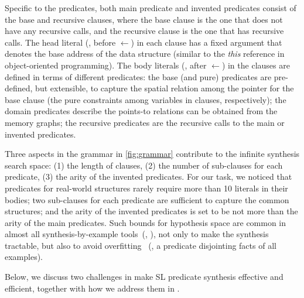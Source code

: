 Specific to the predicates,
both main predicate and invented predicates consist of the base and recursive clauses, where the base clause is the one that does not have any recursive calls, and the recursive clause is the one that has recursive calls. The head literal (\ie, before $\leftarrow$) in each clause has a fixed argument  that denotes the base address of the data structure (similar to the \textit{this} reference in object-oriented programming).
% 
The body literals (\ie, after $\leftarrow$) in the clauses are defined in terms of different predicates: the base (and pure) predicates are pre-defined, but extensible, to capture the spatial relation among the pointer for the base clause (the pure constraints among variables in clauses, respectively); the domain predicates describe the points-to relations can be obtained from the memory graphs; the recursive predicates are the recursive calls to the main or invented predicates.



Three aspects in the grammar in \autoref{fig:grammar} contribute to the
infinite synthesis search space: (1) the length of clauses, (2) the
number of sub-clauses for each predicate, (3) the arity of the
invented predicates. 
%
%
For our task, we noticed that predicates for real-world structures
rarely require more than 10 literals in their bodies; two sub-clauses
for each predicate are sufficient to capture the common structures;
and the arity of the invented predicates is set to be not more than
the arity of the main predicates. Such bounds for hypothesis space are
common in almost all synthesis-by-example tools~(\eg,
\cite{cropper2021learning,lee2021combining,Si-al:FSE18}), not only to
make the synthesis tractable, but also to avoid
overfitting~\cite{PadhiMN019} (\eg, a predicate disjointing facts of
all examples).
%

Below, we discuss two challenges in make SL predicate synthesis
effective and efficient, together with how we address them in \tool.




